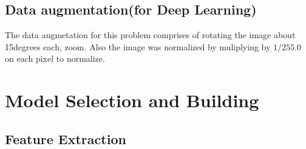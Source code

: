 \documentclass{scrreprt}
\begin{document}
\section{Data augmentation(for Deep Learning)}
The data augmetation for this problem comprises of rotating the image about 15degrees each,  zoom. Also the image was normalized by muliplying by $1/255.0$ on each pixel to normalize.   


%
%

\chapter{Model Selection and Building}

\section{Feature Extraction}
\end{document}
